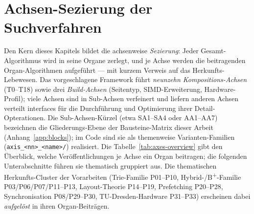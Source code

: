 \section{Achsen-Sezierung der Suchverfahren}\label{sec:sota-axes}
Den Kern dieses Kapitels bildet die achsenweise \emph{Sezierung}: Jeder Gesamt-Algorithmus wird in
seine Organe zerlegt, und je Achse werden die beitragenden Organ-Algorithmen aufgeführt --- mit
kurzem Verweis auf das Herkunfts-Lebewesen. Das vorgeschlagene Framework führt
\emph{neunzehn Kompositions-Achsen} (T0--T18) sowie drei \emph{Build-Achsen} (Seitentyp,
SIMD-Erweiterung, Hardware-Profil); viele Achsen sind in Sub-Achsen verfeinert und liefern anderen
Achsen verteilt interfaces für die Durchführung und Optimierung ihrer Detail-Opterationen. Die
Sub-Achsen-Kürzel (etwa SA1--SA4 oder AA1--AA7) bezeichnen die Gliederungs-Ebene der
Bausteine-Matrix dieser Arbeit (Anhang~\ref{app:blocks}); im Code sind sie als themenweise
Varianten-Familien (\texttt{axis\_<nn>\_<name>/}) realisiert. Die Tabelle~\ref{tab:axes-overview}
gibt den Überblick, welche Veröffentlichungen je Achse ein Organ beitragen; die folgenden
Unterabschnitte führen sie thematisch gruppiert aus. Die thematischen Herkunfts-Cluster der
Vorarbeiten (Trie-Familie P01--P10, Hybrid-/B\textsuperscript{+}-Familie P03/P06/P07/P11--P13,
Layout-Theorie P14--P19, Prefetching P20--P28, Synchronisation P08/P29--P30, TU-Dresden-Hardware
P31--P33) erscheinen dabei \emph{aufgelöst} in ihren Organ-Beiträgen.

